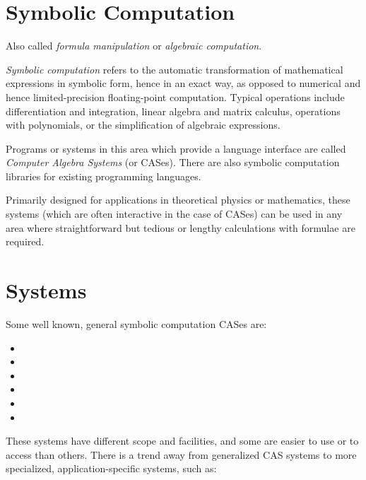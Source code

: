 \documentclass[12pt]{article}
\begin{document}
\section{Symbolic Computation}

Also called \emph{formula manipulation} or \emph{algebraic computation}.  

\emph{Symbolic computation} refers to the automatic transformation of mathematical expressions in symbolic form, hence in an exact way, as opposed to numerical and hence limited-precision floating-point computation.  Typical operations include differentiation and integration, linear algebra and matrix calculus, operations with polynomials, or the simplification of algebraic expressions.

Programs or systems in this area which provide a language interface are called \emph{Computer Algebra Systems} (or CASes).  There are also symbolic computation libraries for existing programming languages. 

Primarily designed for applications in theoretical physics or mathematics, these systems (which are often interactive in the case of CASes) can be used in any area where straightforward but tedious or lengthy calculations with formulae are required. 

\section{Systems}

Some well known, general symbolic computation CASes are:

\begin{itemize}

\item {}
\item {}
\item {}
\item {}
\item {}
\item {}

\end{itemize}

These systems have different scope and facilities, and some are easier to use or to access than others.  There is a trend away from generalized CAS systems to more specialized, application-specific systems, such as:
\end{document}
